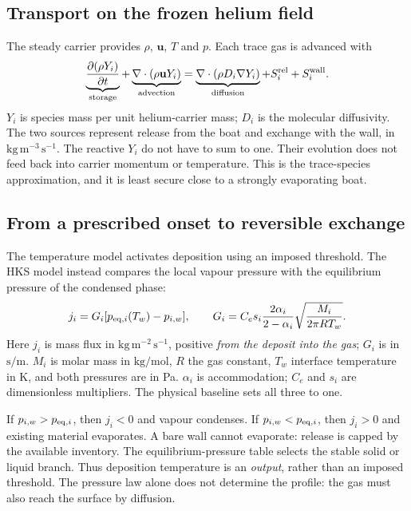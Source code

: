 \documentclass[10pt,a4paper]{article}
\begin{document}
\subsection{Transport on the frozen helium field}
The steady carrier provides $\rho$, $\mathbf u$, $T$ and $p$. Each trace
gas is advanced with
\begin{equation}
 \underbrace{\frac{\partial(\rho Y_i)}{\partial t}}_{\text{storage}}
 +\underbrace{\nabla\cdot(\rho\mathbf uY_i)}_{\text{advection}}
 =\underbrace{\nabla\cdot(\rho D_i\nabla Y_i)}_{\text{diffusion}}
 +S_i^{\rm rel}+S_i^{\rm wall}.
 \label{eq:transport}
\end{equation}
$Y_i$ is species mass per unit helium-carrier mass; $D_i$ is the molecular
diffusivity. The two sources represent release from the boat and exchange
with the wall, in $\mathrm{kg\,m^{-3}\,s^{-1}}$. The reactive $Y_i$ do not
have to sum to one. Their evolution does not feed back into carrier
momentum or temperature. This is the trace-species approximation, and it
is least secure close to a strongly evaporating boat.

\subsection{From a prescribed onset to reversible exchange}
The temperature model activates deposition using an imposed threshold.
The HKS model instead compares the local vapour pressure with the
equilibrium pressure of the condensed phase:
\begin{equation}
 j_i=G_i[p_{{\rm eq},i}(T_w)-p_{i,w}],\qquad
 G_i=C_e s_i\frac{2\alpha_i}{2-\alpha_i}
       \sqrt{\frac{M_i}{2\pi RT_w}}.
 \label{eq:hks}
\end{equation}
Here $j_i$ is mass flux in $\mathrm{kg\,m^{-2}\,s^{-1}}$, positive
\emph{from the deposit into the gas}; $G_i$ is in $\mathrm{s/m}$.
$M_i$ is molar mass in $\mathrm{kg/mol}$, $R$ the gas constant,
$T_w$ interface temperature in K, and both pressures are in Pa.
$\alpha_i$ is accommodation; $C_e$ and $s_i$ are dimensionless
multipliers. The physical baseline sets all three to one.

If $p_{i,w}>p_{{\rm eq},i}$, then $j_i<0$ and vapour condenses.
If $p_{i,w}<p_{{\rm eq},i}$, then $j_i>0$ and existing material evaporates.
A bare wall cannot evaporate: release is capped by the available inventory.
The equilibrium-pressure table selects the stable solid or liquid branch.
Thus deposition temperature is an \emph{output}, rather than an imposed
threshold. The pressure law alone does not determine the profile: the gas
must also reach the surface by diffusion.
\end{document}
